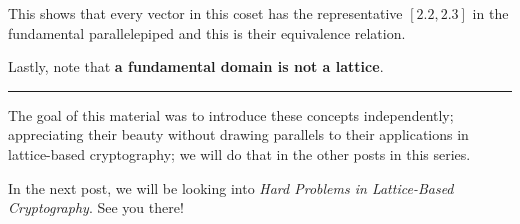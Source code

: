 \documentclass[11pt]{article}
\begin{document}
This shows that every vector in this coset has the representative
\([2.2, 2.3]\) in the fundamental parallelepiped and this is their
equivalence relation.

Lastly, note that \textbf{a fundamental domain is not a lattice}.

\begin{center}\rule{0.5\linewidth}{0.5pt}\end{center}

    The goal of this material was to introduce these concepts independently;
appreciating their beauty without drawing parallels to their
applications in lattice-based cryptography; we will do that in the other
posts in this series.

In the next post, we will be looking into \emph{Hard Problems in
Lattice-Based Cryptography}. See you there!


    
    
    
\end{document}
